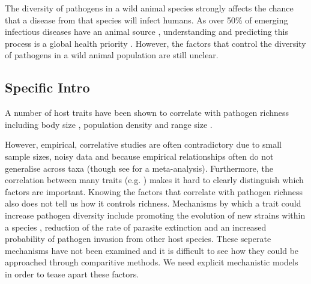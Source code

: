 The diversity of pathogens in a wild animal species strongly affects the chance that a disease from that species will infect humans.
As over 50\% of emerging infectious diseases have an animal source  \cite{jones2008global, smith2014global}, understanding and predicting this process is a global health priority  \cite{taylor2001risk}.
However, the factors that control the diversity of pathogens in a wild animal population are still unclear\cite{metcalf2015five}.




\subsection{Specific Intro}


A number of host traits have been shown to correlate with pathogen richness including body size \cite{kamiya2014determines, arneberg2002host}, population density \cite{nunn2003comparative, arneberg2002host} and range size \cite{bordes2011impact, kamiya2014determines}.






However, empirical, correlative studies are often contradictory due to small sample sizes, noisy data and because empirical relationships often do not generalise across taxa (though see \cite{kamiya2014determines} for a meta-analysis).
Furthermore, the correlation between many traits (e.g. \cite{nunn2015infectious}) makes it hard to clearly distinguish which factors are important.
Knowing the factors that correlate with pathogen richness also does not tell us how it controls richness. 
Mechanisms by which a trait could increase pathogen diversity include promoting the evolution of new strains within a species \cite{buckee2004effects}, reduction of the rate of parasite extinction and an increased probability of pathogen invasion from other host species.
These seperate mechanisms have not been examined and it is difficult to see how they could be approached through comparitive methods.
We need explicit mechanistic models in order to tease apart these factors.





